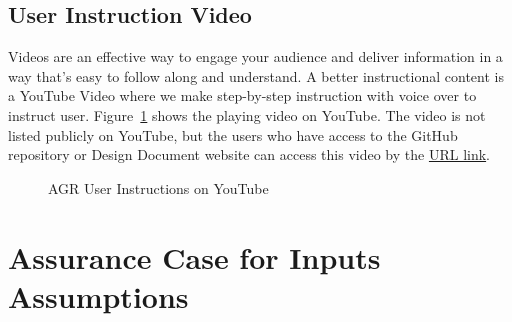 \subsection{User Instruction Video}
Videos are an effective way to engage your audience and deliver information in a way that's easy to follow along and understand. A better instructional content is a YouTube Video where we make step-by-step instruction with voice over to instruct user. Figure~\ref{fig_video} shows the playing video on YouTube. The video is not listed publicly on YouTube, but the users who have access to the GitHub repository or Design Document website can access this video by the \href{https://www.youtube.com/watch?v=1eK5k6bazNs}{URL link}.

\begin{figure}[H]
    \centering
    \caption[AGR User Instructions on YouTube]{AGR User Instructions on YouTube}
    \label{fig_video}
\end{figure}


\section{Assurance Case for Inputs Assumptions}

